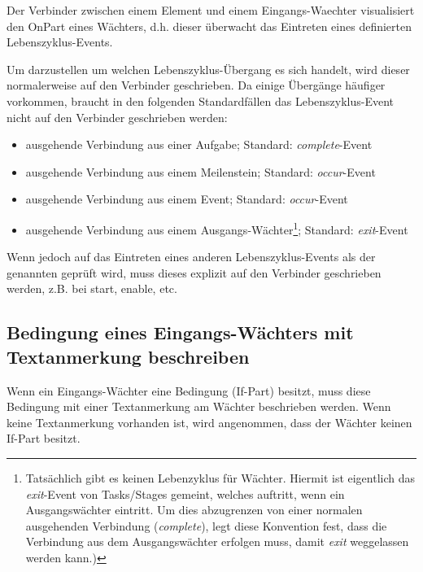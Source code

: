 \documentclass[12pt,report]{snetTeaching}
\begin{document}
Der Verbinder zwischen einem Element und einem Eingangs-\gls{Waechter} visualisiert den OnPart eines Wächters, d.h. dieser überwacht das Eintreten eines definierten Lebenszyklus-Events. 

Um darzustellen um welchen Lebenszyklus-Übergang es sich handelt, wird dieser normalerweise auf den Verbinder geschrieben. Da einige Übergänge häufiger vorkommen, braucht in den folgenden Standardfällen das Lebenszyklus-Event nicht auf den Verbinder geschrieben werden: 
\begin{itemize}
\item ausgehende Verbindung aus einer Aufgabe; Standard: \emph{complete}-Event
\item ausgehende Verbindung aus einem Meilenstein; Standard: \emph{occur}-Event
\item ausgehende Verbindung aus einem Event; Standard: \emph{occur}-Event
\item ausgehende Verbindung aus einem Ausgangs-Wächter\footnote{Tatsächlich gibt es keinen Lebenzyklus für Wächter. Hiermit ist eigentlich das \emph{exit}-Event von Tasks/Stages gemeint, welches auftritt, wenn ein Ausgangswächter eintritt. Um dies abzugrenzen von einer normalen ausgehenden Verbindung (\emph{complete}), legt diese Konvention fest, dass die Verbindung aus dem Ausgangswächter erfolgen muss, damit \emph{exit} weggelassen werden kann.)}; Standard: \emph{exit}-Event
\end{itemize}

Wenn jedoch auf das Eintreten eines anderen Lebenszyklus-Events als der genannten geprüft wird, muss dieses explizit auf den Verbinder geschrieben werden, z.B. bei start, enable, etc.










\subsection{Bedingung eines Eingangs-Wächters mit Textanmerkung beschreiben}

Wenn ein Eingangs-Wächter eine Bedingung (If-Part) besitzt, muss diese Bedingung mit einer Textanmerkung am Wächter beschrieben werden. Wenn keine Textanmerkung vorhanden ist, wird angenommen, dass der Wächter keinen If-Part besitzt. 
\end{document}

